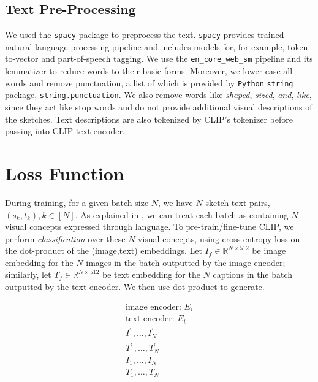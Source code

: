 \subsection{Text Pre-Processing}
We used the \texttt{spacy} package to preprocess the text. \texttt{spacy} provides trained natural language processing pipeline and includes models for, for example, token-to-vector and part-of-speech tagging. We use the \texttt{en\_core\_web\_sm} pipeline and its lemmatizer to reduce words to their basic forms. Moreover, we lower-case all words and remove punctuation, a list of which is provided by \texttt{Python} \texttt{string} package, \texttt{string.punctuation}. We also remove words like \textit{shaped}, \textit{sized}, \textit{and}, \textit{like}, since they act like stop words and do not provide additional visual descriptions of the sketches. Text descriptions are also tokenized by CLIP's tokenizer before passing into CLIP text encoder.     

\section{Loss Function}
During training, for a given batch size $N$, we have $N$ sketch-text pairs, $(s_k,t_k), k\in [N]$. 
As explained in \cite{CLIPpaper}, we can treat each batch as containing $N$ visual concepts expressed through language.    
To pre-train/fine-tune CLIP, we perform \textit{classification} over these $N$ visual concepts, using cross-entropy loss on the dot-product of the (image,text) embeddings. 
Let $I_f \in \mathbb{R}^{N \times 512}$ be image embedding for the $N$ images in the batch outputted by the image encoder; similarly, 
let $T_f \in \mathbb{R}^{N \times 512}$ be text embedding for the $N$ captions in the batch outputted by the text encoder. 
We then use dot-product to generate.

\begin{equation}
\begin{split}
    \text{image encoder: } E_i \\
    \text{text encoder: } E_t \\
    I_1^{'},\dots, I_N^{'} \\
    T_1^{'},\dots, T_N^{'} \\
    I_1,\dots, I_N \\
    T_1,\dots, T_N 
\end{split}
\end{equation}



